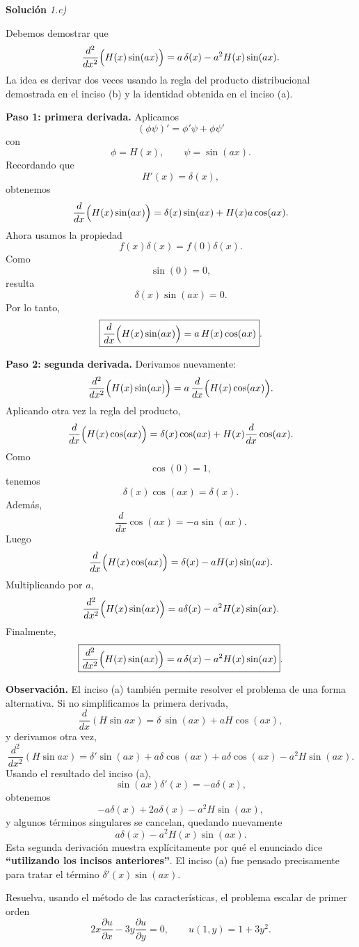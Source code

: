 \documentclass[11pt,spanish]{article}
\newcounter{problema}
\newcommand{\prob}{\stepcounter{problema} \vspace{.5cm} \noindent{\bf Problema \arabic{problema}: }}
\begin{document}
\vspace{0.5cm}
{\bf Soluci\'on }{\em 1.c)}
\vspace{0.5cm}

Debemos demostrar que
$$
\frac{d^2}{dx^2}\Bigl(H(x)\sin(ax)\Bigr)
=
a\,\delta(x)-a^2H(x)\sin(ax).
$$
La idea es derivar dos veces usando la regla del producto distribucional demostrada en el inciso (b) y la identidad obtenida en el inciso (a).

{\bf Paso 1: primera derivada.}
Aplicamos
$$
(\phi\psi)'=\phi'\psi+\phi\psi'
$$
con
$$
\phi=H(x),
\qquad
\psi=\sin(ax).
$$
Recordando que
$$
H'(x)=\delta(x),
$$
obtenemos
$$
\frac{d}{dx}\Bigl(H(x)\sin(ax)\Bigr)
=
\delta(x)\sin(ax)
+
H(x)a\cos(ax).
$$
Ahora usamos la propiedad
$$
f(x)\delta(x)=f(0)\delta(x).
$$
Como
$$
\sin(0)=0,
$$
resulta
$$
\delta(x)\sin(ax)=0.
$$
Por lo tanto,
$$
\boxed{
\frac{d}{dx}\Bigl(H(x)\sin(ax)\Bigr)
=
a\,H(x)\cos(ax)
}.
$$

{\bf Paso 2: segunda derivada.}
Derivamos nuevamente:
$$
\frac{d^2}{dx^2}\Bigl(H(x)\sin(ax)\Bigr)
=
a\,\frac{d}{dx}\Bigl(H(x)\cos(ax)\Bigr).
$$
Aplicando otra vez la regla del producto,
$$
\frac{d}{dx}\Bigl(H(x)\cos(ax)\Bigr)
=
\delta(x)\cos(ax)
+
H(x)\frac{d}{dx}\cos(ax).
$$
Como
$$
\cos(0)=1,
$$
tenemos
$$
\delta(x)\cos(ax)=\delta(x).
$$
Además,
$$
\frac{d}{dx}\cos(ax)
=
-a\sin(ax).
$$
Luego
$$
\frac{d}{dx}\Bigl(H(x)\cos(ax)\Bigr)
=
\delta(x)
-aH(x)\sin(ax).
$$
Multiplicando por $a$,
$$
\frac{d^2}{dx^2}\Bigl(H(x)\sin(ax)\Bigr)
=
a\delta(x)
-a^2H(x)\sin(ax).
$$
Finalmente,
$$
\boxed{
\frac{d^2}{dx^2}\Bigl(H(x)\sin(ax)\Bigr)
=
a\,\delta(x)
-
a^2H(x)\sin(ax)
}.
$$

{\bf Observación.}
El inciso (a) también permite resolver el problema de una forma alternativa. Si no simplificamos la primera derivada,
$$
\frac{d}{dx}(H\sin ax)
=
\delta\,\sin(ax)+aH\cos(ax),
$$
y derivamos otra vez,
$$
\frac{d^2}{dx^2}(H\sin ax)
=
\delta'\sin(ax)
+
a\delta\cos(ax)
+
a\delta\cos(ax)
-
a^2H\sin(ax).
$$
Usando el resultado del inciso (a),
$$
\sin(ax)\delta'(x)
=
-a\delta(x),
$$
obtenemos
$$
-a\delta(x)+2a\delta(x)-a^2H\sin(ax),
$$
y algunos términos singulares se cancelan, quedando nuevamente
$$
a\delta(x)-a^2H(x)\sin(ax).
$$
Esta segunda derivación muestra explícitamente por qué el enunciado dice {\bf ``utilizando los incisos anteriores''}. El inciso (a) fue pensado precisamente para tratar el término $\delta'(x)\sin(ax)$.




\prob Resuelva, usando el método de las características, el problema escalar de primer orden
\[
2x\frac{\partial u}{\partial x} - 3y\frac{\partial u}{\partial y} = 0,\qquad u(1,y)=1+3y^2.
\]
\end{document}

